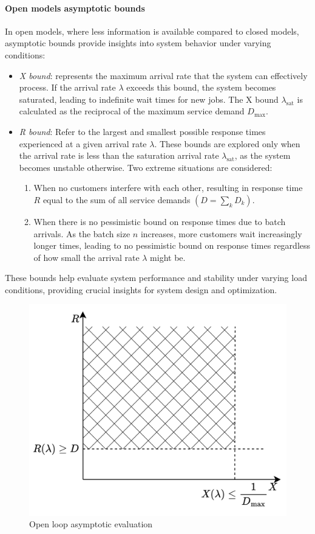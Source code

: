 \paragraph*{Open models asymptotic bounds}
In open models, where less information is available compared to closed models, asymptotic bounds provide insights into system behavior under varying conditions:
\begin{itemize}
    \item \textit{X bound}: represents the maximum arrival rate that the system can effectively process. 
        If the arrival rate $\lambda$ exceeds this bound, the system becomes saturated, leading to indefinite wait times for new jobs.
        The X bound $\lambda_{\text{sat}}$ is calculated as the reciprocal of the maximum service demand $D_{\max}$. 
    \item \textit{R bound}: Refer to the largest and smallest possible response times experienced at a given arrival rate $\lambda$. 
        These bounds are explored only when the arrival rate is less than the saturation arrival rate $\lambda_{\text{sat}}$, as the system becomes unstable otherwise.
        Two extreme situations are considered:
        \begin{enumerate}
            \item When no customers interfere with each other, resulting in response time $R$ equal to the sum of all service demands $(D=\sum_kD_k)$. 
            \item When there is no pessimistic bound on response times due to batch arrivals. 
                As the batch size $n$ increases, more customers wait increasingly longer times, leading to no pessimistic bound on response times regardless of how small the arrival rate $\lambda$ might be.
        \end{enumerate}
\end{itemize}
These bounds help evaluate system performance and stability under varying load conditions, providing crucial insights for system design and optimization.

\begin{figure}[H]
    \centering
    \includegraphics[width=0.45\linewidth]{images/cmod.png}
    \caption{Open loop asymptotic evaluation}
\end{figure}

